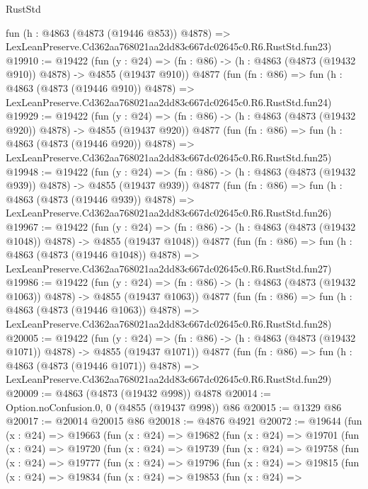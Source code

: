 \begin{lexlean}{RustStd}
\begin{coremodule}
    fun (h : @4863 (@4873 (@19446 @853)) @4878) =>
    LexLeanPreserve.Cd362aa768021aa2dd83c667dc02645c0.R6.RustStd.fun23)
@19910 := @19422
    (fun (y : @24) => (fn : @86) -> (h : @4863 (@4873 (@19432 @910)) @4878) -> @4855 (@19437 @910))
    @4877
    (fun (fn : @86) =>
    fun (h : @4863 (@4873 (@19446 @910)) @4878) =>
    LexLeanPreserve.Cd362aa768021aa2dd83c667dc02645c0.R6.RustStd.fun24)
@19929 := @19422
    (fun (y : @24) => (fn : @86) -> (h : @4863 (@4873 (@19432 @920)) @4878) -> @4855 (@19437 @920))
    @4877
    (fun (fn : @86) =>
    fun (h : @4863 (@4873 (@19446 @920)) @4878) =>
    LexLeanPreserve.Cd362aa768021aa2dd83c667dc02645c0.R6.RustStd.fun25)
@19948 := @19422
    (fun (y : @24) => (fn : @86) -> (h : @4863 (@4873 (@19432 @939)) @4878) -> @4855 (@19437 @939))
    @4877
    (fun (fn : @86) =>
    fun (h : @4863 (@4873 (@19446 @939)) @4878) =>
    LexLeanPreserve.Cd362aa768021aa2dd83c667dc02645c0.R6.RustStd.fun26)
@19967 := @19422
    (fun (y : @24) =>
    (fn : @86) -> (h : @4863 (@4873 (@19432 @1048)) @4878) -> @4855 (@19437 @1048))
    @4877
    (fun (fn : @86) =>
    fun (h : @4863 (@4873 (@19446 @1048)) @4878) =>
    LexLeanPreserve.Cd362aa768021aa2dd83c667dc02645c0.R6.RustStd.fun27)
@19986 := @19422
    (fun (y : @24) =>
    (fn : @86) -> (h : @4863 (@4873 (@19432 @1063)) @4878) -> @4855 (@19437 @1063))
    @4877
    (fun (fn : @86) =>
    fun (h : @4863 (@4873 (@19446 @1063)) @4878) =>
    LexLeanPreserve.Cd362aa768021aa2dd83c667dc02645c0.R6.RustStd.fun28)
@20005 := @19422
    (fun (y : @24) =>
    (fn : @86) -> (h : @4863 (@4873 (@19432 @1071)) @4878) -> @4855 (@19437 @1071))
    @4877
    (fun (fn : @86) =>
    fun (h : @4863 (@4873 (@19446 @1071)) @4878) =>
    LexLeanPreserve.Cd362aa768021aa2dd83c667dc02645c0.R6.RustStd.fun29)
@20009 := @4863 (@4873 (@19432 @998)) @4878
@20014 := Option.noConfusion.{0, 0} (@4855 (@19437 @998)) @86
@20015 := @1329 @86
@20017 := @20014 @20015 @86
@20018 := @4876 @4921
@20072 := @19644
    (fun (x : @24) =>
    @19663
      (fun (x : @24) =>
      @19682
        (fun (x : @24) =>
        @19701
          (fun (x : @24) =>
          @19720
            (fun (x : @24) =>
            @19739
              (fun (x : @24) =>
              @19758
                (fun (x : @24) =>
                @19777
                  (fun (x : @24) =>
                  @19796
                    (fun (x : @24) =>
                    @19815
                      (fun (x : @24) =>
                      @19834
                        (fun (x : @24) =>
                        @19853
                          (fun (x : @24) =>

\end{coremodule}
\end{lexlean}
